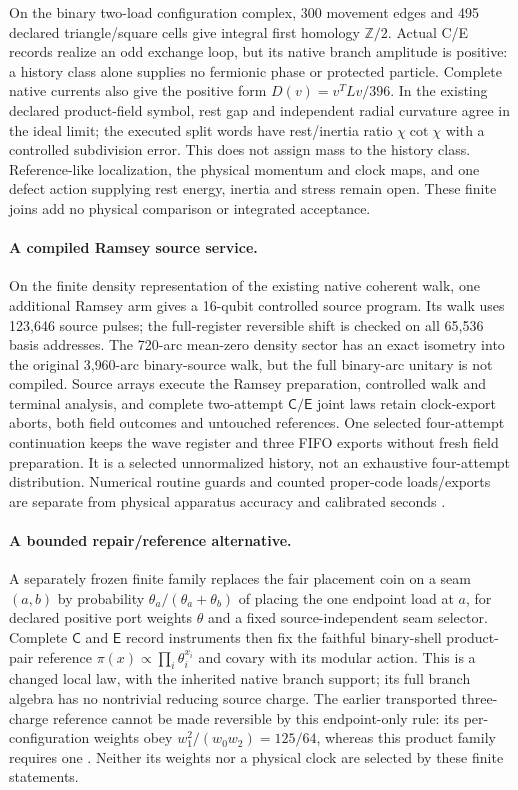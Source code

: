 \documentclass[11pt]{article}
\theoremstyle{definition}
\theoremstyle{remark}
\theoremstyle{plain}
\newcommand{\Cn}{\mathsf{C}}
\newcommand{\En}{\mathsf{E}}
\begin{document}
On the binary two-load configuration complex, 300 movement edges and 495
declared triangle/square cells give integral first homology
$\mathbb Z/2$. Actual C/E records realize an odd exchange loop, but its
native branch amplitude is positive: a history class alone supplies no
fermionic phase or protected particle. Complete native currents also give
the positive form $D(v)=v^TLv/396$. In the existing declared product-field
symbol, rest gap and independent radial curvature agree in the ideal limit;
the executed split words have rest/inertia ratio $\chi\cot\chi$ with a
controlled subdivision error. This does not assign mass to the history
class. Reference-like localization, the physical momentum and clock maps,
and one defect action supplying rest energy, inertia and stress remain open.
These finite joins add no physical comparison or integrated acceptance.

\paragraph{A compiled Ramsey source service.}
On the finite density representation of the existing native coherent walk,
one additional Ramsey arm gives a 16-qubit controlled source program. Its
walk uses 123{,}646 source pulses; the full-register reversible shift is
checked on all 65{,}536 basis addresses. The 720-arc mean-zero density
sector has an exact isometry into the original 3{,}960-arc binary-source
walk, but the full binary-arc unitary is not compiled. Source arrays execute
the Ramsey preparation, controlled walk and terminal analysis, and complete
two-attempt $\Cn/\En$ joint laws retain clock-export aborts, both field
outcomes and untouched references. One selected four-attempt continuation
keeps the wave register and three FIFO exports without fresh field
preparation. It is a selected unnormalized history, not an exhaustive
four-attempt distribution. Numerical routine guards and counted proper-code
loads/exports are separate from physical apparatus accuracy and calibrated
seconds \cite{ramseyService}.

\paragraph{A bounded repair/reference alternative.}
A separately frozen finite family replaces the fair placement coin on a seam
$(a,b)$ by probability $\theta_a/(\theta_a+\theta_b)$ of placing the one
endpoint load at $a$, for declared positive port weights $\theta$ and a
fixed source-independent seam selector. Complete $\Cn$ and $\En$ record
instruments then fix the faithful binary-shell
product-pair reference $\pi(x)\propto\prod_i\theta_i^{x_i}$ and covary with
its modular action. This is a changed local law, with the inherited native
branch support; its full branch algebra has no nontrivial reducing
source charge. The earlier transported three-charge reference cannot be
made reversible by this endpoint-only rule: its per-configuration weights
obey $w_1^2/(w_0w_2)=125/64$, whereas this product family requires one
\cite{localRepairFamily}. Neither its weights nor a physical clock are
selected by these finite statements.
\end{document}
